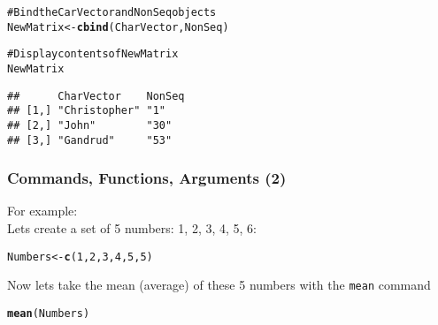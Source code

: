 \documentclass{beamer}\usepackage{graphicx, color}
\makeatletter
\newcommand{\hlfunctioncall}[1]{\textcolor[rgb]{0.501960784313725,0,0.329411764705882}{\textbf{#1}}}%
\newcommand{\hlcomment}[1]{\textcolor[rgb]{0.180392156862745,0.6,0.341176470588235}{#1}}%
\newenvironment{kframe}{%
 \def\at@end@of@kframe{}%
 \ifinner\ifhmode%
  \def\at@end@of@kframe{\end{minipage}}%
  \begin{minipage}{\columnwidth}%
 \fi\fi%
 \def\FrameCommand##1{\hskip\@totalleftmargin \hskip-\fboxsep
 \colorbox{shadecolor}{##1}\hskip-\fboxsep
     \hskip-\linewidth \hskip-\@totalleftmargin \hskip\columnwidth}%
 \MakeFramed {\advance\hsize-\width
   \@totalleftmargin\z@ \linewidth\hsize
   \@setminipage}}%
 {\par\unskip\endMakeFramed%
 \at@end@of@kframe}
\newenvironment{knitrout}{}{} %
\makeatother
\begin{document}
\begin{frame}
\begin{knitrout}
\color{fgcolor}\begin{kframe}
\begin{alltt}
\hlcomment{# Bind the CarVector and NonSeq objects}
NewMatrix <- \hlfunctioncall{cbind}(CharVector, NonSeq)

\hlcomment{# Display contents of NewMatrix}
NewMatrix
\end{alltt}
\begin{verbatim}
##      CharVector    NonSeq
## [1,] "Christopher" "1"   
## [2,] "John"        "30"  
## [3,] "Gandrud"     "53"
\end{verbatim}
\end{kframe}
\end{knitrout}

\end{frame}



\begin{frame}[fragile]
  \frametitle{Commands, Functions, Arguments (2)}
  {\LARGE{For example:}} \\[0.5cm]
  Lets create a set of 5 numbers: 1, 2, 3, 4, 5, 6:

\begin{kframe}
\begin{alltt}
Numbers <- \hlfunctioncall{c}(1, 2, 3, 4, 5, 5)
\end{alltt}
\end{kframe}


Now lets take the mean (average) of these 5 numbers with the {\tt{mean}} command

\begin{kframe}
\begin{alltt}
\hlfunctioncall{mean}(Numbers)
\end{alltt}
\end{kframe}
[1] 3.333



\end{frame}
\end{document}
